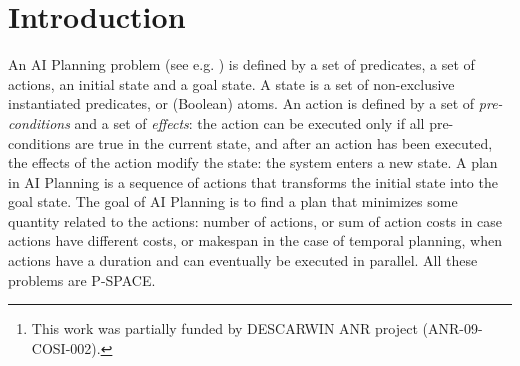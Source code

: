 \documentclass{llncs}
\def\dae{{\em Divide-and-Evolve}}
\def\DAE{{\sc DaE}}
\newcommand{\DAEYAHSP}{{\sc DaE$_{\text{YAHSP}}$}}
\def\YAHSP{{\sc YAHSP}}
\begin{document}
\maketitle              %
\renewcommand{\thefootnote}{}
\begin{abstract}
All standard Artifical Intelligence (AI) planners to-date can only handle a single objective, and the only way for them to take into account multiple objectives is by aggregation of the objectives. Furthermore, and in deep contrast with the single objective case, there exists no benchmark problems on which to test the algorithms for multi-objective planning.

\dae\ (\DAE) is an evolutionary planner that won the (single-objective) deterministic temporal satisficing track in the last International Planning Competition. Even though it uses intensively the classical (and hence single-objective) planner \YAHSP\ ({\em Yet Another Heuristic Search Planner}), it is possible to turn \DAEYAHSP\ into a multi-objective evolutionary planner.

A tunable benchmark suite for multi-objective planning is first proposed, and the performances of several variants of multi-objective \DAEYAHSP\ are compared on different instances of this benchmark, hopefully paving the road to further multi-objective competitions in AI planning.\footnote{This work was partially funded by DESCARWIN ANR project (ANR-09-COSI-002).}


\end{abstract}
%
\section{Introduction}


An AI Planning problem (see e.g. \cite{AIplanningBook2004}) is defined by a set of predicates, a set of actions, an initial state and a goal state. A state is a set of non-exclusive instantiated predicates, or (Boolean) atoms. An action is defined by a set of {\em pre-conditions} and a set of {\em effects}: the action can be executed only if all pre-conditions are true in the current state, and after an action has been executed, the effects of the action modify the state: the system enters a new state.
A plan in AI Planning is a sequence of actions that transforms the initial state into the goal state. 
The goal of AI Planning is to find a plan that minimizes some quantity related to the actions: number of actions, or sum of action costs in case actions have different costs, or makespan in the case of temporal planning, when actions have a duration and can eventually be executed in parallel. All these problems are P-SPACE.
\end{document}
